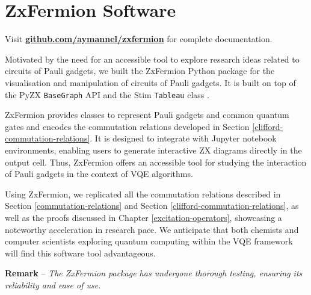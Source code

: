 \chapter{ZxFermion Software}%
\label{zxfermion}

Visit \textbf{\href{https://github.com/aymannel/zxfermion}{github.com/aymannel/zxfermion} }for complete documentation.

Motivated by the need for an accessible tool to explore research ideas related to circuits of Pauli gadgets, we built the ZxFermion Python package for the visualisation and manipulation of circuits of Pauli gadgets. It is built on top of the PyZX \lstinline{BaseGraph} API \cite{Kissinger2020} and the Stim \lstinline{Tableau} class \cite{Gidney2021}.

ZxFermion provides classes to represent Pauli gadgets and common quantum gates and encodes the commutation relations developed in Section \ref{clifford-commutation-relations}. It is designed to integrate with Jupyter notebook environments, enabling users to generate interactive ZX diagrams directly in the output cell. Thus, ZxFermion offers an accessible tool for studying the interaction of Pauli gadgets in the context of VQE algorithms.

Using ZxFermion, we replicated all the commutation relations described in Section \ref{commutation-relations} and Section \ref{clifford-commutation-relations}, as well as the proofs discussed in Chapter \ref{excitation-operators}, showcasing a noteworthy acceleration in research pace. We anticipate that both chemists and computer scientists exploring quantum computing within the VQE framework will find this software tool advantageous.

\hangindent=10pt 
\textbf{Remark} -- \textit{The ZxFermion package has undergone thorough testing, ensuring its reliability and ease of use.}

